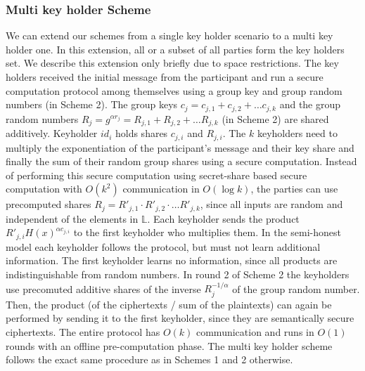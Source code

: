 \subsubsection{Multi key holder Scheme} \label{Multi-Key-Holder}
We can extend our schemes from a single key holder scenario to a multi key holder one. In this extension, all or a subset of all parties form the key holders set. 
We describe this extension only briefly due to space restrictions.
The key holders received the initial message from the participant and run a secure computation protocol among themselves using a group key and group random numbers (in Scheme 2).
The group keys $c_j = c_{j,1} + c_{j,2} + \ldots c_{j,k}$ and the group random numbers $R_j = g^{\alpha r_j} = R_{j,1} + R_{j,2} + \ldots R_{j,k}$ (in Scheme 2) are shared additively.
Keyholder $id_i$ holds shares $c_{j,i}$ and $R_{j,i}$.
The $k$ keyholders need to multiply the exponentiation of the participant's message and their key share and finally the sum of their random group shares using a secure computation.
Instead of performing this secure computation using secret-share based secure computation with $O(k^2)$ communication in $O(\log{k})$, the parties can use precomputed shares $R_j = R'_{j,1} \cdot R'_{j,2} \cdot \ldots R'_{j,k}$, since all inputs are random and independent of the elements in $\mathbb{L}$.
Each keyholder sends the product $R'_{j,i} H(x)^{\alpha c_{j,i}}$ to the first keyholder who multiplies them.
In the semi-honest model each keyholder follows the protocol, but must not learn additional information.
The first keyholder learns no information, since all products are indistinguishable from random numbers.
In round 2 of Scheme 2 the keyholders use precomuted additive shares of the inverse $R_j^{-1/\alpha}$ of the group random number.
Then, the product (of the ciphertexts / sum of the plaintexts) can again be performed by sending it to the first keyholder, since they are semantically secure ciphertexts.
The entire protocol has $O(k)$ communication and runs in $O(1)$ rounds with an offline pre-computation phase.
The multi key holder scheme follows the exact same procedure as in Schemes 1 and 2 otherwise. 
